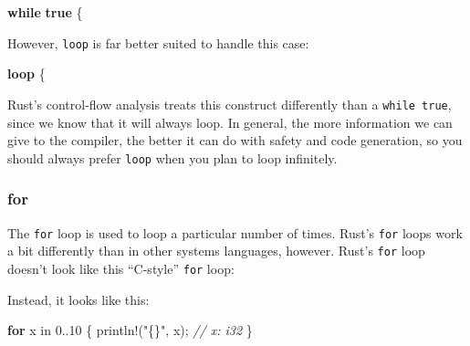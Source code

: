 \documentclass[a4paper,]{book}
\newenvironment{Shaded}{\begin{snugshade}}{\end{snugshade}}
\newcommand{\KeywordTok}[1]{\textcolor[rgb]{0.13,0.29,0.53}{\textbf{{#1}}}}
\newcommand{\DecValTok}[1]{\textcolor[rgb]{0.00,0.00,0.81}{{#1}}}
\newcommand{\CharTok}[1]{\textcolor[rgb]{0.31,0.60,0.02}{{#1}}}
\newcommand{\StringTok}[1]{\textcolor[rgb]{0.31,0.60,0.02}{{#1}}}
\newcommand{\CommentTok}[1]{\textcolor[rgb]{0.56,0.35,0.01}{\textit{{#1}}}}
\newcommand{\OtherTok}[1]{\textcolor[rgb]{0.56,0.35,0.01}{{#1}}}
\newcommand{\NormalTok}[1]{{#1}}
\begin{document}
\begin{Shaded}
\begin{Highlighting}[]
\KeywordTok{while} \KeywordTok{true} \NormalTok{\{}
\end{Highlighting}
\end{Shaded}

However, \texttt{loop} is far better suited to handle this case:

\begin{Shaded}
\begin{Highlighting}[]
\KeywordTok{loop} \NormalTok{\{}
\end{Highlighting}
\end{Shaded}

Rust's control-flow analysis treats this construct differently than a
\texttt{while\ true}, since we know that it will always loop. In
general, the more information we can give to the compiler, the better it
can do with safety and code generation, so you should always prefer
\texttt{loop} when you plan to loop infinitely.

\subsubsection{for}\label{for}

The \texttt{for} loop is used to loop a particular number of times.
Rust's \texttt{for} loops work a bit differently than in other systems
languages, however. Rust's \texttt{for} loop doesn't look like this
``C-style'' \texttt{for} loop:

\begin{Shaded}
\end{Shaded}

Instead, it looks like this:

\begin{Shaded}
\begin{Highlighting}[]
\KeywordTok{for} \NormalTok{x in }\DecValTok{0.}\NormalTok{.}\DecValTok{10} \NormalTok{\{}
    \OtherTok{println!}\NormalTok{(}\StringTok{"\{\}"}\NormalTok{, x); }\CommentTok{// x: i32}
\NormalTok{\}}
\end{Highlighting}
\end{Shaded}
\end{document}
